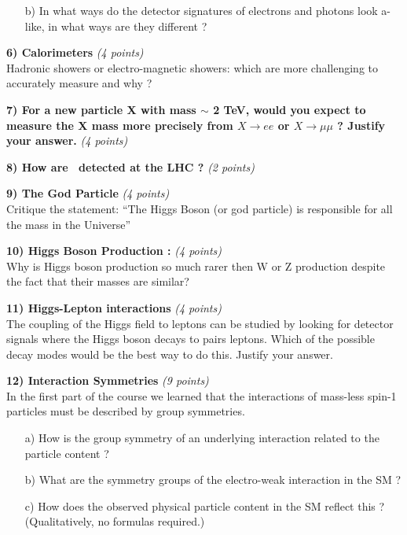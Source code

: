 {\begin{itemize}
\item[b)]{ In what ways do the detector signatures of electrons and photons look a-like, in what ways are they different ?
}
\end{itemize}

\clearpage
        

\textbf{6) Calorimeters } \hfill \textit{(4 points)}\\
Hadronic showers or electro-magnetic showers: which are more challenging to accurately measure and why ? 

\vspace*{2.5in}

\textbf{7) For a new particle X with mass $\sim$ 2 TeV,  would you expect to measure the X mass more precisely from $X\rightarrow ee$ or $X \rightarrow \mu\mu$ ? Justify your answer.} \hfill \textit{(4 points)}\\
\vspace*{2.5in}


\textbf{8) How are \nus\ detected at the LHC ?} \hfill \textit{(2 points)}\\


\clearpage

\textbf{9) The God Particle } \hfill \textit{(4 points)} \\ 
Critique the statement:  ``The Higgs Boson (or god particle) is responsible for all the mass in the Universe''

\vspace*{1.5in}

\textbf{10) Higgs Boson Production : } \hfill \textit{(4 points)}\\
Why is Higgs boson production so much rarer then W or Z production despite the fact that their masses are similar?    

\vspace*{1.5in}


\textbf{11) Higgs-Lepton interactions } \hfill \textit{(4 points)}\\
The coupling of the Higgs field to leptons can be studied by looking for detector signals where the Higgs boson decays to pairs leptons.
Which of the possible decay modes would be the best way to do this.  Justify your answer.

\clearpage

\textbf{12) Interaction Symmetries } \hfill \textit{(9 points)} \\ 
In the first part of the course we learned that the interactions of mass-less spin-1 particles must be described by group symmetries. 
\begin{itemize}
\item[a)]{How is the group symmetry of an underlying interaction related to the particle content ?}
\vspace*{1.5in}
\item[b)]{What are the symmetry groups of the electro-weak interaction in the SM ? }
\vspace*{1.5in}
\item[c)]{How does the observed physical particle content in the SM reflect this ? (Qualitatively, no formulas required.) }
\vspace*{1.5in}
\end{itemize}

}
